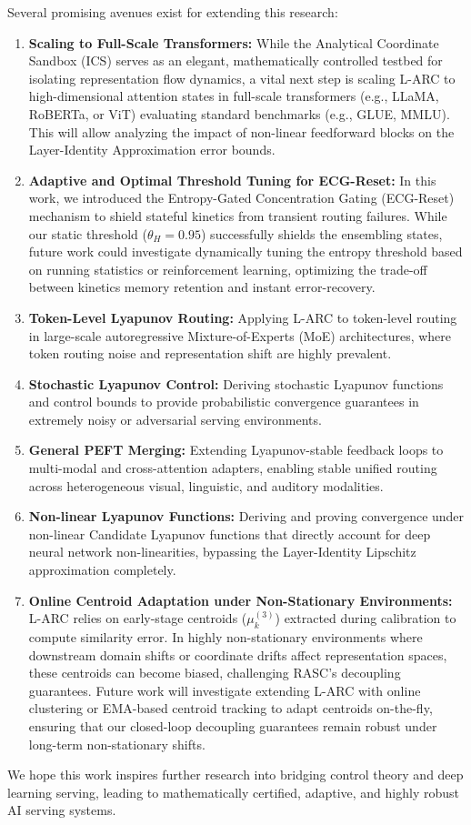 Several promising avenues exist for extending this research:
\begin{enumerate}
    \item \textbf{Scaling to Full-Scale Transformers:} While the Analytical Coordinate Sandbox (ICS) serves as an elegant, mathematically controlled testbed for isolating representation flow dynamics, a vital next step is scaling L-ARC to high-dimensional attention states in full-scale transformers (e.g., LLaMA, RoBERTa, or ViT) evaluating standard benchmarks (e.g., GLUE, MMLU). This will allow analyzing the impact of non-linear feedforward blocks on the Layer-Identity Approximation error bounds.
    \item \textbf{Adaptive and Optimal Threshold Tuning for ECG-Reset:} In this work, we introduced the Entropy-Gated Concentration Gating (ECG-Reset) mechanism to shield stateful kinetics from transient routing failures. While our static threshold ($\theta_H = 0.95$) successfully shields the ensembling states, future work could investigate dynamically tuning the entropy threshold based on running statistics or reinforcement learning, optimizing the trade-off between kinetics memory retention and instant error-recovery.
    \item \textbf{Token-Level Lyapunov Routing:} Applying L-ARC to token-level routing in large-scale autoregressive Mixture-of-Experts (MoE) architectures, where token routing noise and representation shift are highly prevalent.
    \item \textbf{Stochastic Lyapunov Control:} Deriving stochastic Lyapunov functions and control bounds to provide probabilistic convergence guarantees in extremely noisy or adversarial serving environments.
    \item \textbf{General PEFT Merging:} Extending Lyapunov-stable feedback loops to multi-modal and cross-attention adapters, enabling stable unified routing across heterogeneous visual, linguistic, and auditory modalities.
    \item \textbf{Non-linear Lyapunov Functions:} Deriving and proving convergence under non-linear Candidate Lyapunov functions that directly account for deep neural network non-linearities, bypassing the Layer-Identity Lipschitz approximation completely.
    \item \textbf{Online Centroid Adaptation under Non-Stationary Environments:} L-ARC relies on early-stage centroids ($\mu_k^{(3)}$) extracted during calibration to compute similarity error. In highly non-stationary environments where downstream domain shifts or coordinate drifts affect representation spaces, these centroids can become biased, challenging RASC's decoupling guarantees. Future work will investigate extending L-ARC with online clustering or EMA-based centroid tracking to adapt centroids on-the-fly, ensuring that our closed-loop decoupling guarantees remain robust under long-term non-stationary shifts.
\end{enumerate}
We hope this work inspires further research into bridging control theory and deep learning serving, leading to mathematically certified, adaptive, and highly robust AI serving systems.

